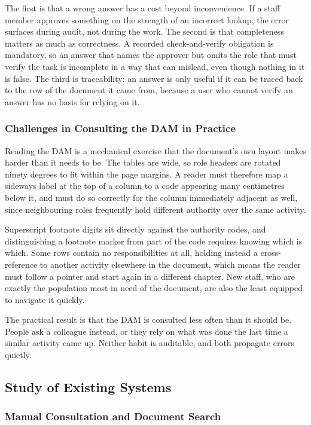 The first is that a wrong answer has a cost beyond inconvenience. If a staff member approves something on the strength of an incorrect lookup, the error surfaces during audit, not during the work. The second is that completeness matters as much as correctness. A recorded check-and-verify obligation is mandatory, so an answer that names the approver but omits the role that must verify the task is incomplete in a way that can mislead, even though nothing in it is false. The third is traceability: an answer is only useful if it can be traced back to the row of the document it came from, because a user who cannot verify an answer has no basis for relying on it.

\subsubsection{Challenges in Consulting the DAM in Practice}

Reading the DAM is a mechanical exercise that the document's own layout makes harder than it needs to be. The tables are wide, so role headers are rotated ninety degrees to fit within the page margins. A reader must therefore map a sideways label at the top of a column to a code appearing many centimetres below it, and must do so correctly for the column immediately adjacent as well, since neighbouring roles frequently hold different authority over the same activity.

Superscript footnote digits sit directly against the authority codes, and distinguishing a footnote marker from part of the code requires knowing which is which. Some rows contain no responsibilities at all, holding instead a cross-reference to another activity elsewhere in the document, which means the reader must follow a pointer and start again in a different chapter. New staff, who are exactly the population most in need of the document, are also the least equipped to navigate it quickly.

The practical result is that the DAM is consulted less often than it should be. People ask a colleague instead, or they rely on what was done the last time a similar activity came up. Neither habit is auditable, and both propagate errors quietly.

\subsection{Study of Existing Systems}

\subsubsection{Manual Consultation and Document Search}

